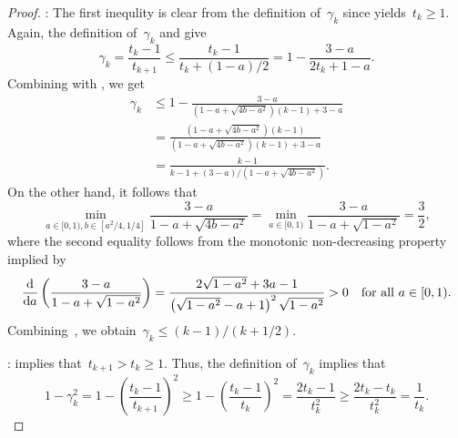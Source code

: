 \documentclass[../main]{subfiles}
\begin{document}
\begin{proof}
    :
    The first inequlity is clear from the definition of~$\gamma_k$ since  yields~$t_k \ge 1$.
    Again, the definition of~$\gamma_k$ and  give
    \begin{equation}
        \gamma_k = \frac{t_k - 1}{t_{k + 1}} \le \frac{t_k - 1}{t_k + (1 - a) / 2} = 1 - \frac{3 - a}{2 t_k + 1 - a}
    .\end{equation} 
    Combining with , we get
    \begin{equation} \label{eq:gamma}
        \begin{split}
            \gamma_k &\le 1 - \frac{3 - a}{\left(1 - a + \sqrt{4 b - a^2} \right)(k - 1) + 3 - a} \\
        &= \frac{\left( 1 - a + \sqrt{4 b - a^2} \right) (k - 1)}{\left(1 - a + \sqrt{4 b - a^2} \right)(k - 1) + 3 - a} \\
        &= \frac{k - 1}{k - 1 + (3 - a) / \left( 1 - a + \sqrt{4 b - a^2} \right)}
        .\end{split}
    \end{equation} 
    On the other hand, it follows that
    \begin{equation} \label{eq:min a b}
        \min_{a \in [0, 1), b \in [a^2 / 4, 1 / 4]} \frac{3 - a}{1 - a + \sqrt{4 b - a^2}} = \min_{a \in [0, 1)} \frac{3 - a}{1 - a + \sqrt{1 - a^2}} = \frac{3}{2}
    ,\end{equation}
    where the second equality follows from the monotonic non-decreasing property implied by
    \begin{equation}
        \odv*{\left(\frac{3 - a}{1 - a + \sqrt{1 - a^2}}\right)}{a} = \frac{2 \sqrt{1 - a^2} + 3a - 1}{\left( \sqrt{1 - a^2} - a + 1 \right)^2 \sqrt{1 - a^2}} > 0 \forallcondition{a \in [0, 1)}
    .\end{equation}  
    Combining~, we obtain~$\gamma_k \le (k - 1) / (k + 1 / 2)$.

    :
     implies that~$t_{k + 1} > t_k \ge 1$.
    Thus, the definition of~$\gamma_k$ implies that
    \begin{equation}
        1 - \gamma_k^2 = 1 - \left( \frac{t_k - 1}{t_{k + 1}} \right)^2 \ge 1 - \left( \frac{t_k - 1}{t_k} \right)^2
        = \frac{2 t_k - 1}{t_k^2} \ge \frac{2 t_k - t_k}{t_k^2} = \frac{1}{t_k}
    .\end{equation}
\end{proof}
\end{document}
